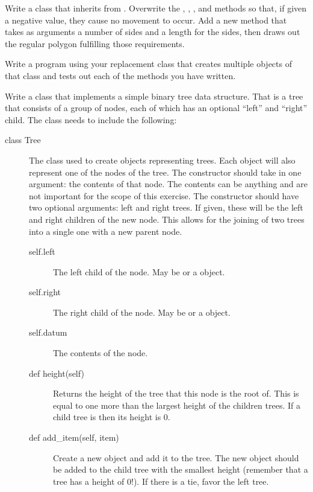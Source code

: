 \documentclass[11pt]{cselabheader}
\begin{document}
\begin{ex}[myturtle.py]
    Write a class that inherits from . Overwrite
    the , , ,
    and  methods so that, if given a negative value, they
    cause no movement to occur. Add a new method 
    that takes as arguments a number of sides and a length for the sides, then
    draws out the regular polygon fulfilling those requirements.

    Write a program using your replacement  class that
    creates multiple objects of that class and tests out each of the methods
    you have written.
\end{ex}

\begin{ex}[tree.py]
    Write a class that implements a simple binary tree data structure. That is a
    tree that consists of a group of nodes, each of which has an optional
    ``left'' and ``right'' child. The class needs to include the following:
    \begin{description}
    \item[class Tree] The class used to create objects representing trees. Each
        object will also represent one of the nodes of the tree. The constructor
        should take in one argument: the contents of that node. The contents can
        be anything and are not important for the scope of this exercise. The
        constructor should have two optional arguments: left and right trees. If
        given, these will be the left and right children of the new node. This
        allows for the joining of two trees into a single one with a new parent
        node.
        \begin{description}
        \item[self.left] The left child of the node. May be
             or a  object.
        \item[self.right] The right child of the node. May be
             or a  object.
        \item[self.datum] The contents of the node.
        \item[def height(self)] Returns the height of the tree that this node
            is the root of. This is equal to one more than the largest height
            of the children trees. If a child tree is  then
            its height is 0.
        \item[def add\_item(self, item)] Create a new  object
            and add it to the tree. The new object should be added to the child
            tree with the smallest height (remember that a 
            tree has a height of 0!). If there is a tie, favor the left tree.
        \end{description}
    \end{description}


\end{ex}
\end{document}
